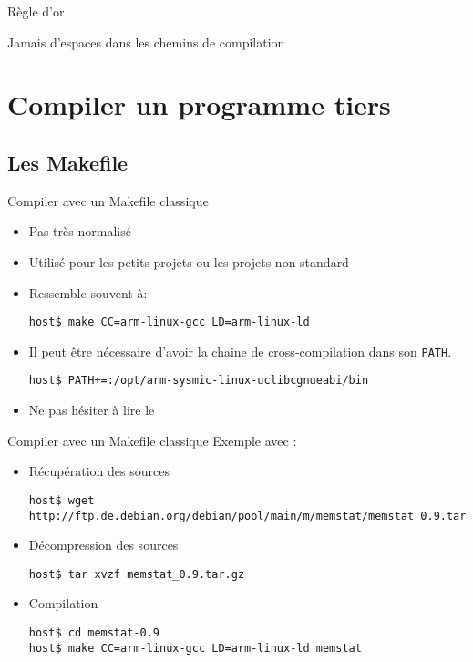 \begin{frame}[fragile=singleslide]{Règle d'or}
  \begin{center}
    \huge{Jamais d'espaces dans les chemins de compilation}
  \end{center}
\end{frame}

\section{Compiler un programme tiers}

\subsection{Les Makefile}

\begin{frame}[fragile=singleslide]{Compiler avec un Makefile classique}
  \begin{itemize}
  \item Pas très normalisé
  \item Utilisé pour les petits projets ou les projets non standard
  \item Ressemble souvent à:
    \begin{lstlisting}
host$ make CC=arm-linux-gcc LD=arm-linux-ld
    \end{lstlisting} %
  \item Il peut être nécessaire d'avoir la chaine de cross-compilation
    dans son \verb+PATH+.
    \begin{lstlisting}
host$ PATH+=:/opt/arm-sysmic-linux-uclibcgnueabi/bin
    \end{lstlisting} %
  \item Ne pas hésiter à lire le 
  \end{itemize}
\end{frame}

\begin{frame}[fragile=singleslide]{Compiler avec un Makefile classique}
  Exemple avec :
  \begin{itemize}
  \item Récupération des sources
    \begin{lstlisting}
host$ wget http://ftp.de.debian.org/debian/pool/main/m/memstat/memstat_0.9.tar.gz
    \end{lstlisting}
  \item Décompression des sources
\begin{lstlisting}
host$ tar xvzf memstat_0.9.tar.gz
\end{lstlisting}
  \item Compilation
\begin{lstlisting}
host$ cd memstat-0.9
host$ make CC=arm-linux-gcc LD=arm-linux-ld memstat
\end{lstlisting} %
  \end{itemize}
\end{frame}


